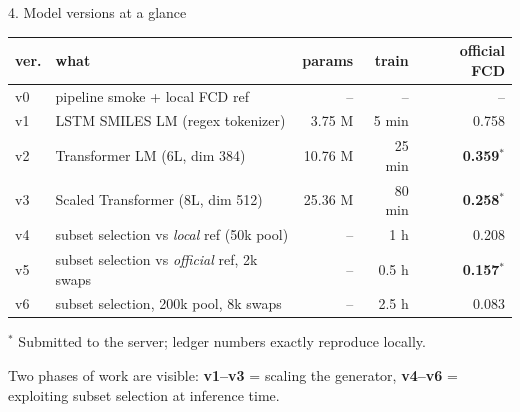 \documentclass[aspectratio=169,11pt]{beamer}
\begin{document}
\begin{frame}{4. Model versions at a glance}
  \small
  \begin{tabular}{lp{5.3cm}rrr}
    \toprule
    \textbf{ver.} & \textbf{what} & \textbf{params} & \textbf{train} & \textbf{official FCD} \\
    \midrule
    v0 & pipeline smoke + local FCD ref     & --      & --     & --     \\
    v1 & LSTM SMILES LM (regex tokenizer)   & 3.75 M  & 5 min  & 0.758  \\
    v2 & Transformer LM (6L, dim 384)       & 10.76 M & 25 min & \textbf{0.359}$^*$ \\
    v3 & Scaled Transformer (8L, dim 512)   & 25.36 M & 80 min & \textbf{0.258}$^*$ \\
    \midrule
    v4 & subset selection vs \emph{local} ref (50k pool) & --   & 1 h & 0.208 \\
    v5 & subset selection vs \emph{official} ref, 2k swaps & --   & 0.5 h & \textbf{0.157}$^*$ \\
    v6 & subset selection, 200k pool, 8k swaps & --   & 2.5 h & 0.083 \\
    \bottomrule
  \end{tabular}

  \vspace{0.5em}
  $^*$ Submitted to the server; ledger numbers exactly reproduce locally.

  \vspace{0.4em}
  Two phases of work are visible: \textbf{v1--v3} = scaling the generator,
  \textbf{v4--v6} = exploiting subset selection at inference time.
\end{frame}
\end{document}
